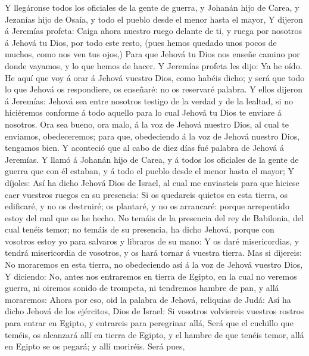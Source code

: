  Y llegáronse todos los oficiales de la gente de guerra, y
Johanán hijo de Carea, y Jezanías hijo de Osaía, y todo el pueblo desde
el menor hasta el mayor,  Y dijeron á Jeremías profeta:
Caiga ahora nuestro ruego delante de ti, y ruega por nosotros á Jehová
tu Dios, por todo este resto, (pues hemos quedado unos pocos de muchos,
como nos ven tus ojos,)  Para que Jehová tu Dios nos
enseñe camino por donde vayamos, y lo que hemos de hacer. 
Y Jeremías profeta les dijo: Ya he oído. He aquí que voy á orar á Jehová
vuestro Dios, como habéis dicho; y será que todo lo que Jehová os
respondiere, os enseñaré: no os reservaré palabra.  Y
ellos dijeron á Jeremías: Jehová sea entre nosotros testigo de la verdad
y de la lealtad, si no hiciéremos conforme á todo aquello para lo cual
Jehová tu Dios te enviare á nosotros.  Ora sea bueno, ora
malo, á la voz de Jehová nuestro Dios, al cual te enviamos,
obedeceremos; para que, obedeciendo á la voz de Jehová nuestro Dios,
tengamos bien.  Y aconteció que al cabo de diez días fué
palabra de Jehová á Jeremías.  Y llamó á Johanán hijo de
Carea, y á todos los oficiales de la gente de guerra que con él estaban,
y á todo el pueblo desde el menor hasta el mayor;  Y
díjoles: Así ha dicho Jehová Dios de Israel, al cual me enviasteis para
que hiciese caer vuestros ruegos en su presencia:  Si os
quedareis quietos en esta tierra, os edificaré, y no os destruiré; os
plantaré, y no os arrancaré: porque arrepentido estoy del mal que os he
hecho.  No temáis de la presencia del rey de Babilonia,
del cual tenéis temor; no temáis de su presencia, ha dicho Jehová,
porque con vosotros estoy yo para salvaros y libraros de su mano:
 Y os daré misericordias, y tendrá misericordia de
vosotros, y os hará tornar á vuestra tierra.  Mas si
dijereis: No moraremos en esta tierra, no obedeciendo así á la voz de
Jehová vuestro Dios,  Y diciendo: No, antes nos
entraremos en tierra de Egipto, en la cual no veremos guerra, ni oiremos
sonido de trompeta, ni tendremos hambre de pan, y allá moraremos:
 Ahora por eso, oid la palabra de Jehová, reliquias de
Judá: Así ha dicho Jehová de los ejércitos, Dios de Israel: Si vosotros
volviereis vuestros rostros para entrar en Egipto, y entrareis para
peregrinar allá,  Será que el cuchillo que teméis, os
alcanzará allí en tierra de Egipto, y el hambre de que tenéis temor,
allá en Egipto se os pegará; y allí moriréis.  Será pues,
